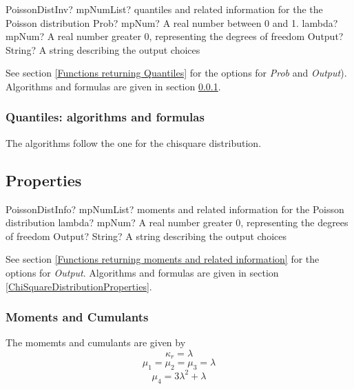 \begin{mpFunctionsExtract}
	\mpFunctionThreeNotImplemented
	{PoissonDistInv? mpNumList? quantiles and related information for the the Poisson distribution}
	{Prob? mpNum? A real number between 0 and 1.}
	{lambda? mpNum? A real number greater 0, representing the degrees of freedom}
	{Output? String? A string describing the output choices}
\end{mpFunctionsExtract}

See section \ref{Functions returning Quantiles} for the options for  {\itshape\sffamily Prob} and {\itshape\sffamily Output}). Algorithms and formulas are given in section \ref{PoissonDistributionQuantilesAlgorithm}.

\subsubsection{Quantiles: algorithms and formulas}
\label{PoissonDistributionQuantilesAlgorithm}
The algorithms follow the one for the chisquare distribution.

\subsection{Properties}
\label{PoissonDistributionProperties}


\begin{mpFunctionsExtract}
	\mpFunctionTwoNotImplemented
	{PoissonDistInfo? mpNumList? moments and related information for the Poisson distribution}
	{lambda? mpNum? A real number greater 0, representing the degrees of freedom}
	{Output? String? A string describing the output choices}
\end{mpFunctionsExtract}

\vspace{0.3cm}

See section \ref{Functions returning moments and related information} for the options for {\itshape\sffamily Output}. Algorithms and formulas are given in section \ref{ChiSquareDistributionProperties}.

\subsubsection{Moments and Cumulants}
The momemts and cumulants are given by
\begin{equation}
	\kappa_{r} = \lambda
\end{equation}
\begin{equation}
	\mu_{1} = \mu_{2} =\mu_{3} = \lambda
\end{equation}
\begin{equation}
	\mu_{4} = 3 \lambda^2 + \lambda
\end{equation}


